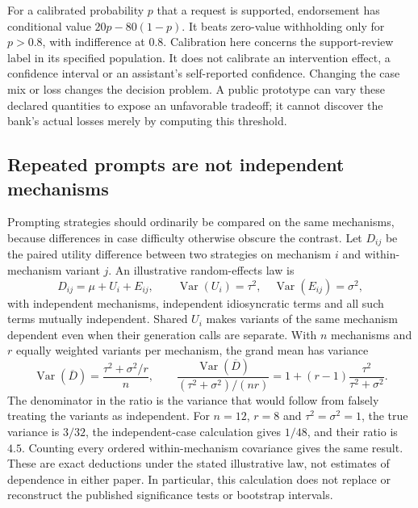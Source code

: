 For a calibrated probability $p$ that a request is supported, endorsement has
conditional value $20p-80(1-p)$. It beats zero-value withholding only for
$p>0.8$, with indifference at 0.8. Calibration here concerns the support-review
label in its specified population. It does not calibrate an intervention
effect, a confidence interval or an assistant's self-reported confidence.
Changing the case mix or loss changes the decision problem. A public prototype
can vary these declared quantities to expose an unfavorable tradeoff; it
cannot discover the bank's actual losses merely by computing this threshold.
\citep{exec17_benchmark_exact}

\subsection{Repeated prompts are not independent mechanisms}

Prompting strategies should ordinarily be compared on the same mechanisms,
because differences in case difficulty otherwise obscure the contrast. Let
$D_{ij}$ be the paired utility difference between two strategies on mechanism
$i$ and within-mechanism variant $j$. An illustrative random-effects law is
\begin{equation}
 D_{ij}=\mu+U_i+E_{ij},\qquad
 \operatorname{Var}(U_i)=\tau^2,\quad
 \operatorname{Var}(E_{ij})=\sigma^2,
 \label{exec17:benchmark-cluster-law}
\end{equation}
with independent mechanisms, independent idiosyncratic terms and all such
terms mutually independent. Shared $U_i$ makes variants of the same mechanism
dependent even when their generation calls are separate. With $n$ mechanisms
and $r$ equally weighted variants per mechanism, the grand mean has variance
\begin{equation}
 \operatorname{Var}(\overline D)
 =\frac{\tau^2+\sigma^2/r}{n},\qquad
 \frac{\operatorname{Var}(\overline D)}{(\tau^2+\sigma^2)/(nr)}
 =1+(r-1)\frac{\tau^2}{\tau^2+\sigma^2}.
 \label{exec17:benchmark-cluster-variance}
\end{equation}
The denominator in the ratio is the variance that would follow from falsely
treating the variants as independent. For $n=12$, $r=8$ and
$\tau^2=\sigma^2=1$, the true variance is $3/32$, the independent-case
calculation gives $1/48$, and their ratio is $4.5$. Counting every ordered
within-mechanism covariance gives the same result. These are exact deductions
under the stated illustrative law, not estimates of dependence in either
paper. In particular, this calculation does not replace or reconstruct the
published significance tests or bootstrap intervals.
\citep{exec17_benchmark_exact}

